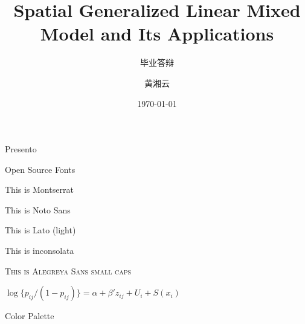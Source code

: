\documentclass[12pt,aspectratio=43]{beamer}
\title{Spatial Generalized Linear Mixed Model and Its Applications}
\subtitle{毕业答辩}
\author{黄湘云}
\institute{中国矿业大学（北京）}
\date{\today}
\begin{document}
\begin{frame}[plain]
\maketitle
\end{frame}

\begin{frame}{Presento}
 \begin{fullpageitemize}
  \item \begin{center}\end{center}
  \item \begin{center}\end{center}
  \item \begin{center}\end{center}
 \end{fullpageitemize}
\end{frame}

\begin{frame}{Open Source Fonts}
 \begin{fullpageitemize}
  \item {\montserratfont This is Montserrat}
  \item {\notosansfont This is Noto Sans}
  \item {\latolightfont This is Lato (light)}
  \item {\inconsolatafont This is inconsolata}
  \item \textsc{This is Alegreya Sans small caps}
  \item $\log \{p_{ij}/(1-p_{ij})\} =\alpha + \beta'z_{ij} + U_{i} + S(x_{i})$
 \end{fullpageitemize}
\end{frame}

\begin{frame}{Color Palette}
 \begin{center}
  \crule[colordgray] \crule[colorhgray] \crule[colorblue] \crule[colorgreen] \crule[colororange]
 \end{center}
\end{frame}
\end{document}
